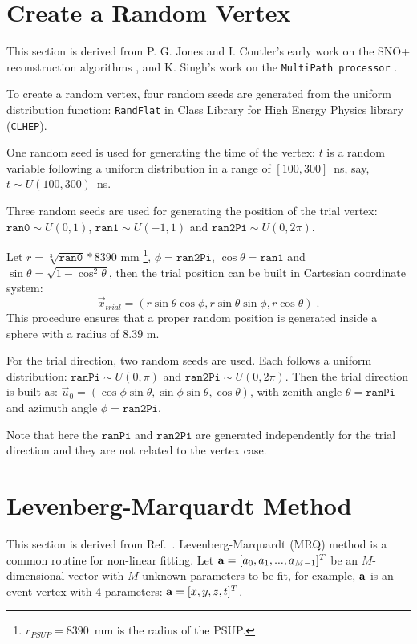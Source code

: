 \section{Create a Random Vertex}\label{appendix:random_gen}

This section is derived from P. G. Jones and I. Coutler's early work on the SNO+ reconstruction algorithms \cite{jones2011background,coulter2013modelling}, and K. Singh's work on the \texttt{MultiPath processor} \cite{kalpanaMPFitter}.

To create a random vertex, four random seeds are generated from the uniform distribution function: \texttt{RandFlat} in Class Library for High Energy Physics library (\texttt{CLHEP}).

One random seed is used for generating the time of the vertex: $t$ is a random variable following a uniform distribution in a range of $[100, 300]$~ns, say, $t\sim U(100,300)$~ns.

Three random seeds are used for generating the position of the trial vertex: $\texttt{ran0}\sim U(0,1)$, $\texttt{ran1}\sim U(-1,1)$ and $\texttt{ran2Pi}\sim U(0,2\pi)$.

Let $r=\sqrt[3]{\texttt{ran0}}*8390$ mm \footnote{$r_{PSUP}=8390$~mm is the radius of the PSUP.}, $\phi=\texttt{ran2Pi}$, $\cos\theta=\texttt{ran1}$ and $\sin\theta=\sqrt{1-{\cos^2\theta}}$, then the trial position can be built in Cartesian coordinate system:
\begin{equation*} 
 \vec{x}_{trial}=(r\sin\theta\cos\phi, r\sin\theta\sin\phi, r\cos\theta)\;.
 \end{equation*}
This procedure ensures that a proper random position is generated inside a sphere with a radius of $8.39$ m.

For the trial direction, two random seeds are used. Each follows a uniform distribution: $\texttt{ranPi}\sim U(0,\pi)$ and $\texttt{ran2Pi}\sim U(0,2\pi)$. Then the trial direction is built as: $\vec{u}_{0}=(\cos\phi\sin\theta,\sin\phi\sin\theta,\cos\theta)$, with zenith angle $\theta=\texttt{ranPi}$ and azimuth angle $\phi=\texttt{ran2Pi}$.

Note that here the $\texttt{ranPi}$ and $\texttt{ran2Pi}$ are generated independently for the trial direction and they are not related to the vertex case.

\section[Levenberg-Marquardt Method]{Levenberg-Marquardt Method}\label{appendix:MRQ}
This section is derived from Ref.~\cite{press2007numerical}. Levenberg-Marquardt (MRQ) method is a common routine for non-linear fitting. Let ${\bf a} = [a_0, a_1, ..., a_{M-1}]^T$ be an $M$-dimensional vector with $M$ unknown parameters to be fit, for example, $\bf a$ is an event vertex with 4 parameters: ${\bf a}=[x,y,z,t]^T$.


